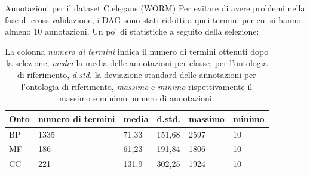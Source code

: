 \documentclass[9pt]{beamer}
\begin{document}
\begin{tframe}{Annotazioni per il dataset C.elegans (WORM)}
Per evitare di avere problemi nella fase di cross-validazione, i DAG sono stati ridotti a quei termini per cui si hanno almeno 10 annotazioni. Un po' di statistiche a seguito della selezione:
\begin{table}[h]
\centering
\begin{tabular}{|l|l|l|l|l|l|}
\hline
\textbf{Onto} & \textbf{numero di termini} & \textbf{media} & \textbf{d.std.} & \textbf{massimo} & \textbf{minimo} \\ \hline
BP            & 1335                & 71,33                & 151,68              & 2597                & 10                  \\ \hline
MF            & 186                 & 61,23                & 191,84              & 1806                & 10                  \\ \hline
CC            & 221                 & 131,9                & 302,25              & 1924                & 10                  \\ \hline
\end{tabular}
\caption{\footnotesize{La colonna \emph{numero di termini} indica il numero di termini ottenuti dopo la selezione, \emph{media} la media delle annotazioni per classe, per l'ontologia di riferimento, \emph{d.std.} la deviazione standard delle annotazioni per l'ontologia di riferimento, \emph{massimo} e \emph{minimo} rispettivamente il massimo e minimo numero di annotazioni.}}
\label{riduzioneann}
\end{table}
\end{tframe}
\end{document}
